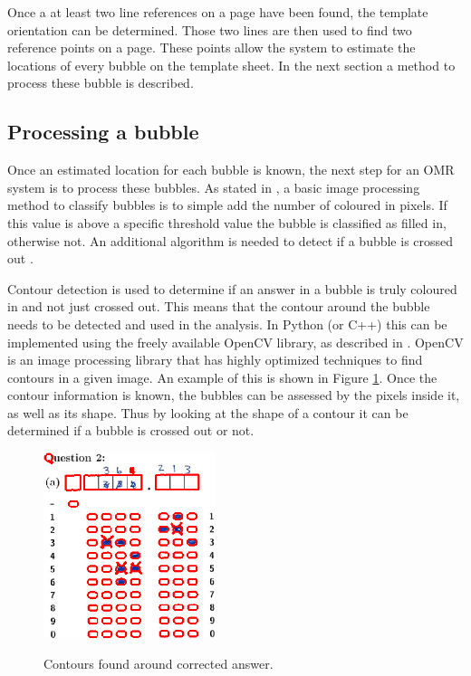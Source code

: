 Once a at least two line references on a page have been found, the template orientation can be determined. Those two lines are then used to find two reference points on a page. These points allow the system to estimate the locations of every bubble on the template sheet. In the next section a method to process these bubble is described.

\subsection{Processing a bubble}

Once an estimated location for each bubble is known, the next step for an OMR system is to process these bubbles. As stated in \citet{MVGI2015}, a basic image processing method to classify bubbles is to simple add the number of coloured in pixels. If this value is above a specific threshold value the bubble is classified as filled in, otherwise not. An additional algorithm is needed to detect if a bubble is crossed out .

Contour detection is used to determine if an answer in a bubble is truly coloured in and not just crossed out. This means that the contour around the bubble needs to be detected and used in the analysis. In Python (or C++) this can be implemented using the freely available OpenCV library, as described in \citet{AdrianR2016}. OpenCV is an image processing library that has highly optimized techniques to find contours in a given image. An example of this is shown in Figure \ref{fig:Cross}. Once the contour information is known, the bubbles can be assessed by the pixels inside it, as well as its shape. Thus by looking at the shape of a contour it can be determined if a bubble is crossed out or not.
\begin{figure}
  \centering
  \includegraphics[width=5cm]{Cross}\\
  \caption{Contours found around corrected answer.}
  \label{fig:Cross}
\end{figure}

